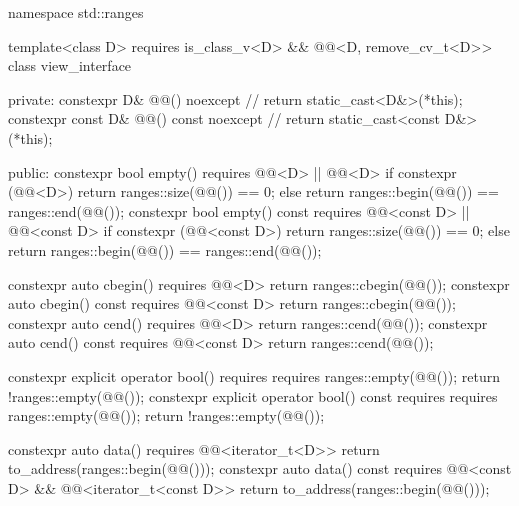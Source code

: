 %
\begin{codeblock}
namespace std::ranges {
  template<class D>
    requires is_class_v<D> && @@<D, remove_cv_t<D>>
  class view_interface {
  private:
    constexpr D& @@() noexcept {               // \expos
      return static_cast<D&>(*this);
    }
    constexpr const D& @@() const noexcept {   // \expos
      return static_cast<const D&>(*this);
    }

  public:
    constexpr bool empty() requires @@<D> || @@<D> {
      if constexpr (@@<D>)
        return ranges::size(@@()) == 0;
      else
        return ranges::begin(@@()) == ranges::end(@@());
    }
    constexpr bool empty() const requires @@<const D> || @@<const D> {
      if constexpr (@@<const D>)
        return ranges::size(@@()) == 0;
      else
        return ranges::begin(@@()) == ranges::end(@@());
    }

    constexpr auto cbegin() requires @@<D> {
      return ranges::cbegin(@@());
    }
    constexpr auto cbegin() const requires @@<const D> {
      return ranges::cbegin(@@());
    }
    constexpr auto cend() requires @@<D> {
      return ranges::cend(@@());
    }
    constexpr auto cend() const requires @@<const D> {
      return ranges::cend(@@());
    }

    constexpr explicit operator bool()
      requires requires { ranges::empty(@@()); } {
        return !ranges::empty(@@());
      }
    constexpr explicit operator bool() const
      requires requires { ranges::empty(@@()); } {
        return !ranges::empty(@@());
      }

    constexpr auto data() requires @@<iterator_t<D>> {
      return to_address(ranges::begin(@@()));
    }
    constexpr auto data() const
      requires @@<const D> && @@<iterator_t<const D>> {
        return to_address(ranges::begin(@@()));
      }

}}
\end{codeblock}
